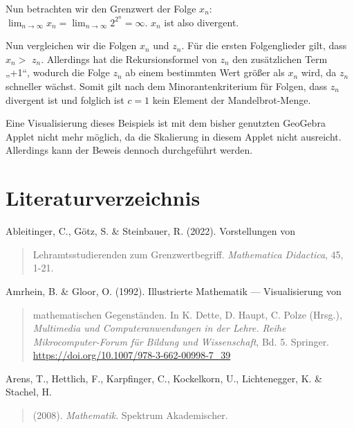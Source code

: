 \documentclass[a4paper, 12pt]{book}
\begin{document}
Nun betrachten wir den Grenzwert der Folge \(x_{n}\):
\(\lim_{n \rightarrow \infty}x_{n} = \lim_{n \rightarrow \infty}2^{2^{n}} = \infty\).
\(x_{n}\) ist also divergent.

Nun vergleichen wir die Folgen \(x_{n}\) und \(z_{n}\). Für die ersten
Folgenglieder gilt, dass \(x_{n} > \) \(z_{n}\). Allerdings hat die
Rekursionsformel von \(z_{n}\) den zusätzlichen Term „+1``, wodurch die
Folge \(z_{n}\) ab einem bestimmten Wert größer als \(x_{n}\) wird, da
\(z_{n}\) schneller wächst. Somit gilt nach dem Minorantenkriterium für
Folgen, dass \(z_{n}\) divergent ist und folglich ist \(c = 1\) kein
Element der Mandelbrot-Menge. \hfill\blacksquare

Eine Visualisierung dieses Beispiels ist mit dem bisher genutzten
GeoGebra Applet nicht mehr möglich, da die Skalierung in diesem Applet
nicht ausreicht. Allerdings kann der Beweis dennoch durchgeführt werden.


\chapter{Literaturverzeichnis}\label{literaturverzeichnis}

Ableitinger, C., Götz, S. \& Steinbauer, R. (2022). Vorstellungen von

\begin{quote}
Lehramtsstudierenden zum Grenzwertbegriff. \emph{Mathematica Didactica},
45, 1-21.
\end{quote}

Amrhein, B. \& Gloor, O. (1992). Illustrierte Mathematik ---
Visualisierung von

\begin{quote}
mathematischen Gegenständen. In K. Dette, D. Haupt, C. Polze (Hrsg.),
\emph{Multimedia und Computeranwendungen in der Lehre. Reihe
Mikrocomputer-Forum für Bildung und Wissenschaft}, Bd. 5. Springer.
\url{https://doi.org/10.1007/978-3-662-00998-7_39}
\end{quote}

Arens, T., Hettlich, F., Karpfinger, C., Kockelkorn, U., Lichtenegger,
K. \& Stachel, H.

\begin{quote}
(2008). \emph{Mathematik}. Spektrum Akademischer.
\end{quote}
\end{document}
